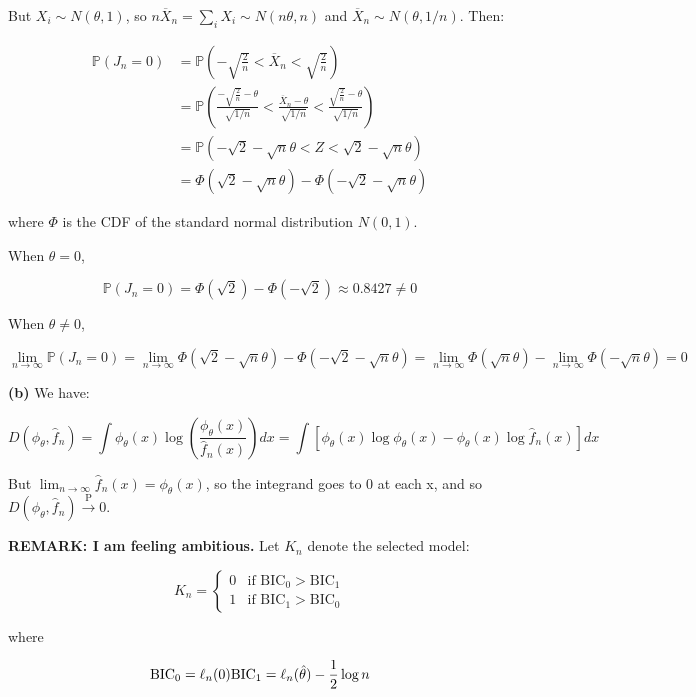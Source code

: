 But \(X_{i} \sim N(\theta, 1)\), so
\(n \overline{X}_{n} = \sum_{i} X_{i} \sim N(n\theta, n)\) and
\(\overline{X}_{n} \sim N(\theta, 1/n)\). Then:

\begin{align*}
\mathbb{P}(J_{n} = 0) &= \mathbb{P}\left(-\sqrt{\frac{2}{n}} < \overline{X}_{n} < \sqrt{\frac{2}{n}} \right) \\
&= \mathbb{P}\left(\frac{-\sqrt{\frac{2}{n}} - \theta}{\sqrt{1/n}} < \frac{\overline{X}_{n} - \theta}{\sqrt{1/n}} < \frac{\sqrt{\frac{2}{n}} - \theta}{\sqrt{1/n}} \right) \\
&= \mathbb{P}\left(-\sqrt{2} - \sqrt{n}\theta < Z < \sqrt{2} - \sqrt{n}\theta \right) \\
&= \Phi(\sqrt{2} - \sqrt{n}\theta) - \Phi(-\sqrt{2} - \sqrt{n}\theta)
\end{align*}

where \(\Phi\) is the CDF of the standard normal distribution
\(N(0, 1)\).

When \(\theta = 0\),

\[\mathbb{P}(J_{n} = 0) = \Phi(\sqrt{2}) - \Phi(-\sqrt{2}) \approx 0.8427 \neq 0\]

When \(\theta \neq 0\),

\[\lim_{n \rightarrow \infty} \mathbb{P}(J_{n} = 0) = \lim_{n \rightarrow \infty}\Phi(\sqrt{2} - \sqrt{n}\theta) - \Phi(-\sqrt{2} - \sqrt{n}\theta) = \lim_{n \rightarrow \infty}\Phi(\sqrt{n}\theta) - \lim_{n \rightarrow \infty}\Phi(-\sqrt{n}\theta) = 0\]

\textbf{(b)} We have:

\[ D(\phi_\theta, \hat{f}_{n}) = \int \phi_\theta(x) \log \left(\frac{\phi_\theta(x)}{\hat{f}_{n}(x)} \right) dx = \int \left[\phi_\theta(x) \log \phi_\theta(x) - \phi_\theta(x) \log \hat{f}_{n}(x) \right] dx \]

But \(\lim_{n \rightarrow \infty} \hat{f}_{n}(x) = \phi_\theta(x)\), so
the integrand goes to 0 at each x, and so
\(D(\phi_\theta, \hat{f}_{n}) \xrightarrow{\text{P}} 0\).

\textbf{REMARK: I am feeling ambitious.} Let \(K_{n}\) denote the selected
model:

\[ K_{n} = \begin{cases}
0 & \text{if } \text{BIC}_{0} > \text{BIC}_{1} \\
1 & \text{if } \text{BIC}_{1} > \text{BIC}_{0}
\end{cases}\]

where

\[
\text{BIC}_{0} = \ell_{n}(0) \\
\text{BIC}_{1} = \ell_{n}(\hat{\theta}) - \frac{1}{2} \log n
\]

